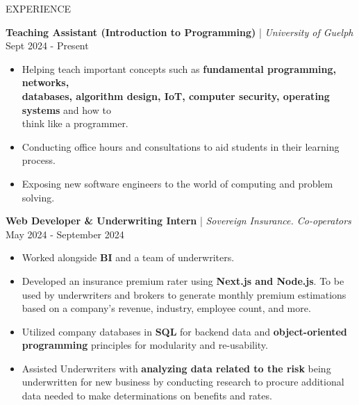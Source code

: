 \begin{rSection}{EXPERIENCE}

\newcommand{\SubItem}[1]{
    {\setlength\itemindent{15pt} \item[\tiny$\bullet] #1}
}

\quad\textbf{Teaching Assistant (Introduction to Programming)} | \textit{University of Guelph} \hfill Sept 2024 - Present\\
\renewcommand\labelitemi{$\vcenter{\hbox{\tiny$\bullet$}}$}
\begin{itemize}
    \itemsep -4pt {} \vspace{-1.5em}
        \item Helping teach important concepts such as \textbf{fundamental programming, networks, \\ databases, algorithm design, IoT, computer security, operating systems} and how to \\ think like a programmer.
        \item Conducting office hours and consultations to aid students in their learning process. 
        \item Exposing new software engineers to the world of computing and problem solving.
\end{itemize}

\quad\textbf{Web Developer \& Underwriting Intern} | \textit{Sovereign Insurance. Co-operators} \hfill May 2024 - September 2024\\
\renewcommand\labelitemi{$\vcenter{\hbox{\tiny$\bullet$}}$}
\begin{itemize}
    \itemsep -5pt {} \vspace{-1.5em} 
        \item Worked alongside \textbf{BI} and a team of underwriters.
        \item Developed an insurance premium rater using \textbf{Next.js and Node.js}. To be used by underwriters and brokers to generate monthly premium estimations based on a company's revenue, industry, employee count, and more.
        \item Utilized company databases in \textbf{SQL} for backend data and \textbf{object-oriented programming} principles for modularity and re-usability.
        \item Assisted Underwriters with \textbf{analyzing data related to the risk} being underwritten for new business by conducting research to procure additional data needed to make determinations on benefits and     rates.
\end{itemize}


\end{rSection}
